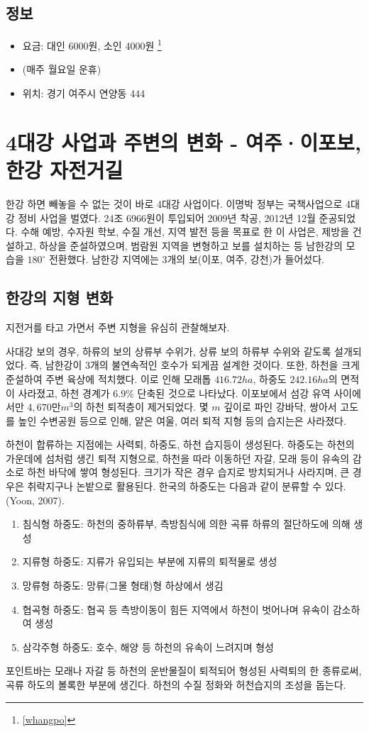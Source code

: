 \subsection{정보}
\begin{itemize}
    \item 요금: 대인 6000원, 소인 4000원 \footnote{\ref{whangpo}}
    \item (매주 월요일 운휴)
    \item 위치: 경기 여주시 연양동 444
\end{itemize}

\section{4대강 사업과 주변의 변화 - 여주·이포보, 한강 자전거길}

한강 하면 빼놓을 수 없는 것이 바로 4대강 사업이다.
이명박 정부는 국책사업으로 4대강 정비 사업을 벌였다.
24조 6966원이 투입되어 2009년 착공, 2012년 12월 준공되었다.
수해 예방, 수자원 학보, 수질 개선, 지역 발전 등을 목표로 한 이 사업은,
제방을 건설하고, 하상을 준설하였으며, 범람원 지역을 변형하고 보를 설치하는 등
남한강의 모습을 $180^\circ$ 전환했다.
남한강 지역에는 3개의 보(이포, 여주, 강천)가 들어섰다.


\subsection{한강의 지형 변화}
지전거를 타고 가면서 주변 지형을 유심히 관찰해보자.

사대강 보의 경우, 하류의 보의 상류부 수위가, 상류 보의 하류부 수위와 같도록 설개되었다.
즉, 남한강이 3개의 불연속적인 호수가 되게끔 설계한 것이다. 또한, 하천을 크게 준설하여 주변 육상에 적치했다.
이로 인해 모래톱 $416.72ha$, 하중도 $242.16ha$의 면적이 사라졌고, 하천 경계가 $6.9\%$ 단축된 것으로 나타났다.
이포보에서 섬강 유역 사이에서만 $4,670만 m^3$의 하천 퇴적층이 제거되었다.
몇 $m$ 깊이로 파인 강바닥, 쌍아서 고도를 높인 수변공원 등으로 인해, 얕은 여울, 여러 퇴적 지형 등의 습지는은 사라졌다.   

하천이 합류하는 지점에는 사력퇴, 하중도, 하천 습지등이 생성된다.
하중도는 하천의 가운데에 섬처럼 생긴 퇴적 지형으로, 하천을 따라 이동하던 자갈, 모래 등이 유속의 감소로 하천 바닥에 쌓여 형성된다.
크기가 작은 경우 습지로 방치되거나 사라지며, 큰 경우은 취락지구나 논밭으로 활용된다. 한국의 하중도는 다음과 같이 분류할 수 있다. (Yoon, 2007).
\begin{enumerate}
    \item 침식형 하중도: 하천의 중하류부, 측방침식에 의한 곡류 하류의 절단하도에 의해 생성
    \item 지류형 하중도: 지류가 유입되는 부분에 지류의 퇴적물로 생성
    \item 망류형 하중도: 망류(그물 형태)형 하상에서 생김
    \item 협곡형 하중도: 협곡 등 측방이동이 힘든 지역에서 하천이 벗어나며 유속이 감소하여 생성
    \item 삼각주형 하중도: 호수, 해양 등 하천의 유속이 느려지며 형성
\end{enumerate}
포인트바는 모래나 자갈 등 하천의 운반물질이 퇴적되어 형성된 사력퇴의 한 종류로써, 곡류 하도의 볼록한 부분에 생긴다.
하천의 수질 정화와 허천습지의 조성을 돕는다.

